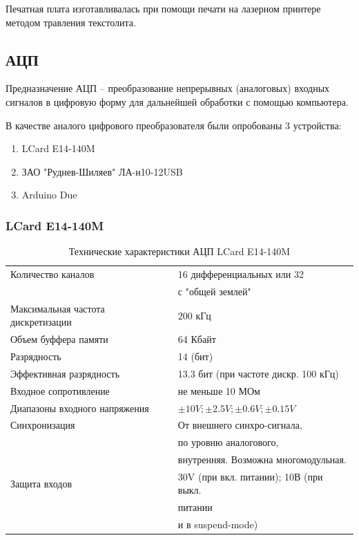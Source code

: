 \documentclass[../paper.tex]{subfiles}
\begin{document}
Печатная плата изготавливалась при помощи печати на лазерном принтере методом травления текстолита. 

\subsection{АЦП}
Предназначение АЦП – преобразование непрерывных (аналоговых) входных сигналов в цифровую форму для дальнейшей обработки с помощью компьютера.

В качестве аналого цифрового преобразователя были опробованы 3 устройства:
\begin{enumerate}
  \item LCard E14-140M
  \item ЗАО "Руднев-Шиляев" ЛА-н10-12USB
  \item Arduino Due
\end{enumerate}

\subsubsection{LCard E14-140M}

\begin{table}[H]
\centering
\caption{Технические характеристики АЦП LCard E14-140M}
\begin{tabular}{|l|l|}
                                                                                     \hline
Количество каналов                 & 16 дифференциальных или 32 \\& с "общей землей" \\ \hline
Максимальная частота дискретизации & 200 кГц                                         \\ \hline
Объем буффера памяти               & 64 Кбайт                                        \\ \hline
Разрядность                        & 14 (бит)                                        \\ \hline
Эффективная разрядность            & 13.3 бит (при частоте дискр. 100 кГц)            \\ \hline
Входное сопротивление              & не меньше 10 МОм                                 \\ \hline
Диапазоны входного напряжения      & $\pm10V;\pm2.5V;\pm0.6V;\pm0.15V$               \\ \hline
Синхронизация                      & От внешнего синхро-сигнала, \\& по уровню аналогового, \\& внутренняя. Возможна многомодульная.          \\ \hline
Защита входов                      & 30V (при вкл. питании); 10В (при выкл. \\&питании \\& и в suspend-mode)       \\ \hline
\end{tabular}
\end{table}
\end{document}
